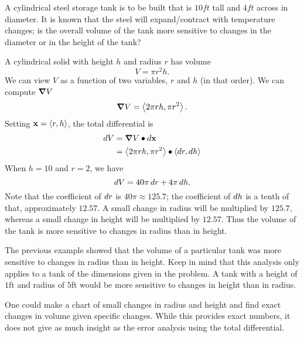 \documentclass{ximera}
\begin{document}
\begin{example}
  A cylindrical steel storage tank is to be built that is
  $10\unit{ft}$ tall and $4\unit{ft}$ across in diameter. It is known
  that the steel will expand/contract with temperature changes; is the
  overall volume of the tank more sensitive to changes in the diameter
  or in the height of the tank?
  \begin{explanation}
    A cylindrical solid with height $h$ and radius $r$ has volume
    \[
    V = \pi r^2h.
    \]
    We can view $V$ as a function of two variables, $r$ and $h$ (in
    that order). We can compute $\boldsymbol\nabla V$
    \[
    \boldsymbol\nabla V  = \left\langle 2\pi rh,\pi r^2\right\rangle.
    \]
    Setting $\mathbf{x}=\left\langle r,h\right\rangle$, the total differential is
    \begin{align*}
    \mathop{}\!d V &=\boldsymbol\nabla V \bullet \mathop{}\!d \mathbf{x}\\
    &=\left\langle 2\pi rh, \pi r^2\right\rangle\bullet\left\langle \mathop{}\!d r,\mathop{}\!d h\right\rangle
    \end{align*}
    When $h = 10$ and $r = 2$, we have
    \[
    \mathop{}\!d V = 40\pi \mathop{}\!d r + 4\pi \mathop{}\!d h.
    \]
    Note that the coefficient of $\mathop{}\!d r$ is $40\pi\approx 125.7$; the
    coefficient of $\mathop{}\!d h$ is a tenth of that, approximately $12.57$. A
    small change in radius will be multiplied by $125.7$, whereas a
    small change in height will be multiplied by $12.57$. Thus the
    volume of the tank is more sensitive to changes in radius than in
    height.
  \end{explanation}
\end{example}

The previous example showed that the volume of a particular tank was
more sensitive to changes in radius than in height. Keep in mind that
this analysis only applies to a tank of the dimensions given in the
problem. A tank with a height of $1$ft and radius of $5$ft would be
more sensitive to changes in height than in radius.

One could make a chart of small changes in radius and height and find
exact changes in volume given specific changes. While this provides
exact numbers, it does not give as much insight as the error analysis
using the total differential.
\end{document}
